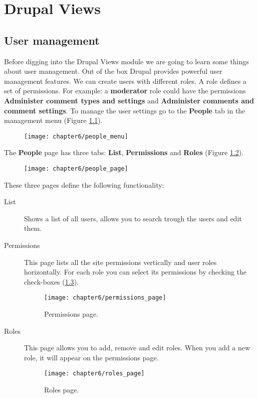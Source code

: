 \chapter{Drupal Views}

\section{User management}

Before digging into the Drupal Views module we are going to learn some things about user management. Out of the box Drupal provides powerful user management features. We can create users with different roles. A role defines a set of permissions. For example: a \textbf{moderator} role could have the permissions \textbf{Administer comment types and settings} and \textbf{Administer comments and comment settings}. To manage the user settings go to the \textbf{People} tab in the management menu (Figure \ref{fig:people_menu}).

  \begin{figure}[H]
  	\centering
  	\texttt{[image: chapter6/people\_menu]}
  	\label{fig:people_menu}
  \end{figure}
  
  The \textbf{People} page has three tabs: \textbf{List}, \textbf{Permissions} and \textbf{Roles} (Figure \ref{fig:people_page}).
  
   \begin{figure}[H]
   	\centering
   	\texttt{[image: chapter6/people\_page]}
   	\label{fig:people_page}
   \end{figure}  
   
   These three pages define the following functionality:
   
   \begin{description}
   	 \item[List] Shows a list of all users, allows you to search trough the users and edit them.
   	 \item[Permissions] This page lists all the site permissions vertically and user roles horizontally. For each role you can select its permissions by checking the check-boxes (\ref{fig:permissions_page}). 
   	 
   	 \begin{figure}[H]
   	 	\centering
   	 	\texttt{[image: chapter6/permissions\_page]}
   	 	\caption{Permissions page.}
   	 	\label{fig:permissions_page}
   	 \end{figure}
   	 
   	 \item[Roles] This page allows you to add, remove and edit roles. When you add a new role, it will appear on the permissions page.
   	 
   	 \begin{figure}[H]
   	 	\centering
   	 	\texttt{[image: chapter6/roles\_page]}
   	 	\caption{Roles page.}
   	 	\label{fig:roles_page}
   	 \end{figure}
   	 
   \end{description}
   
